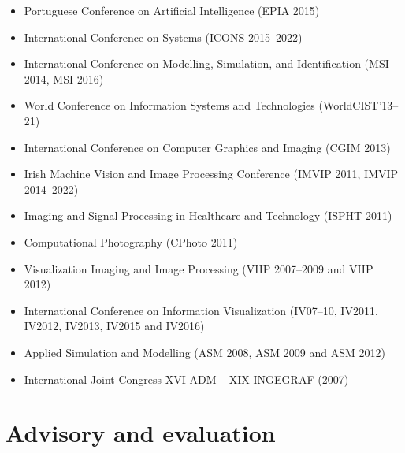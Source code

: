 \documentclass[11pt]{article}
\begin{document}
\begin{itemize}
  \item Portuguese Conference on Artificial Intelligence (EPIA 2015)
  \item International Conference on Systems (ICONS 2015--2022)
  \item International Conference on Modelling, Simulation, and Identification (MSI 2014, MSI 2016)
  \item World Conference on Information Systems and Technologies (WorldCIST'13--21)
  \item International Conference on Computer Graphics and Imaging (CGIM 2013)
  \item Irish Machine Vision and Image Processing Conference (IMVIP 2011, IMVIP 2014--2022)
  \item Imaging and Signal Processing in Healthcare and Technology (ISPHT 2011)
  \item Computational Photography (CPhoto 2011)
  \item Visualization Imaging and Image Processing (VIIP 2007--2009 and VIIP 2012) 
  \item International Conference on Information Visualization (IV07--10, IV2011, IV2012, IV2013, IV2015 and IV2016)
  \item Applied Simulation and Modelling (ASM 2008, ASM 2009 and ASM 2012)
  \item International Joint Congress XVI ADM -- XIX INGEGRAF (2007)
\end{itemize}

\section*{Advisory and evaluation}
\end{document}

